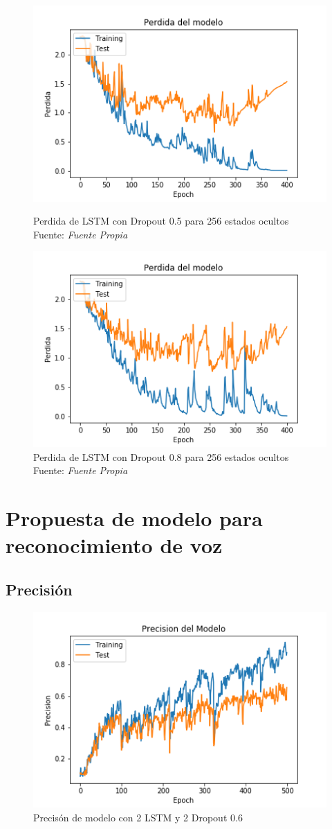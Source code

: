 \begin{figure}[H]
	\centering
	\includegraphics[width=0.7\linewidth]{Figures/lstm5_256_13cost}
	\caption{Perdida de LSTM con Dropout 0.5 para 256 estados ocultos\\ Fuente: {\textit{Fuente Propia}}}
	\label{fig:lstm525613cost}

	\centering
	\includegraphics[width=0.7\linewidth]{Figures/lstm_256_13cost}
	\caption{Perdida de LSTM con Dropout 0.8 para 256 estados ocultos\\ Fuente: {\textit{Fuente Propia}}}
	\label{fig:lstm25613cost}
\end{figure}

\newpage

\section{Propuesta de modelo para reconocimiento de voz}\label{modelo}

\subsection{Precisión}\label{precision_modelo}

\begin{figure}[H]
	\centering
	\includegraphics[width=0.7\linewidth]{Figures/MODEL_prec}
	\caption{Precisón de modelo con 2 LSTM y 2 Dropout 0.6}
	\label{fig:modelprec}
\end{figure}

